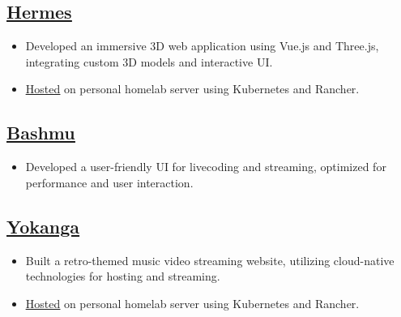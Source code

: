 \documentclass[a4paper,10pt]{article}
\begin{document}
\subsection*{\href{https://github.com/jordojordo/hermes}{\underline{Hermes}}}
\begin{itemize}[leftmargin=1.5em]
    \item Developed an immersive 3D web application using Vue.js and Three.js, integrating custom 3D models and interactive UI.
    \item \href{https://hermes.yokanga.xyz}{\underline{Hosted}} on personal homelab server using Kubernetes and Rancher.
\end{itemize}

\subsection*{\href{https://github.com/jordojordo/bashmu}{\underline{Bashmu}}}
\begin{itemize}[leftmargin=1.5em]
    \item Developed a user-friendly UI for livecoding and streaming, optimized for performance and user interaction.
\end{itemize}

\subsection*{\href{https://github.com/jordojordo/yokanga.xyz}{\underline{Yokanga}}}
\begin{itemize}[leftmargin=1.5em]
    \item Built a retro-themed music video streaming website, utilizing cloud-native technologies for hosting and streaming.
    \item \href{https://yokanga.xyz}{\underline{Hosted}} on personal homelab server using Kubernetes and Rancher.
\end{itemize}
\end{document}
